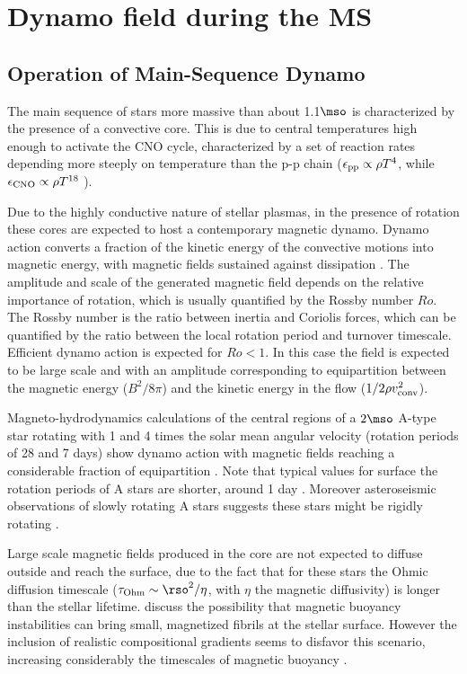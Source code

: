 \section{Dynamo field during the MS}
\subsection{Operation of Main-Sequence Dynamo}
The main sequence of stars more massive than about 1.1$\mso$ is characterized by the presence of a convective core.
This is due to central temperatures high enough to activate the CNO cycle, characterized by a set of reaction rates depending more steeply on temperature than the p-p chain ($\epsilon_{\rm pp}\propto \rho T^{4}$, while $\epsilon_{\rm CNO}\propto \rho T^{18}$ ).

Due to the highly conductive nature of stellar plasmas, in the presence of rotation
these cores are expected to host a contemporary magnetic dynamo. Dynamo action converts a fraction of the kinetic energy 
of the convective motions into magnetic energy, with magnetic fields sustained against dissipation  \citep[see e.g.,][]{Brandenburg_2005}. The amplitude and scale of the generated magnetic field depends on the relative importance of rotation, which is usually quantified by the Rossby number $Ro$. The Rossby number is the ratio between inertia and Coriolis forces, which can be quantified by the ratio between the local rotation period and turnover timescale. 
Efficient dynamo action is expected for $Ro<1$. In this case the field is expected to be large scale and with an amplitude corresponding to equipartition between the magnetic energy ($B^2/8\pi$) and the kinetic energy in the flow ($1/2\rho v^2_{\rm conv}$). 

Magneto-hydrodynamics calculations of the central regions of a $2\mso$ A-type star rotating with 
1 and 4 times the solar mean angular velocity (rotation periods of 28 and 7 days) show dynamo action 
with magnetic fields reaching a considerable fraction of equipartition \citep{Brun_2005}. Note that typical values for surface the rotation periods of A stars are shorter, around 1 day \cite{Zorec_2012}. Moreover asteroseismic observations of slowly rotating A stars suggests these stars might be rigidly rotating \cite{Kurtz_2014}.

Large scale magnetic fields produced in the core are not expected to diffuse outside and reach the surface, due to the fact that for these stars the Ohmic diffusion timescale ($\tau_{\rm Ohm}\sim \rso^2/\eta$, with $\eta$ the magnetic diffusivity) is longer than the stellar lifetime. \citet{MacGregor_2003} discuss the possibility that magnetic buoyancy instabilities can bring small, magnetized fibrils at the stellar surface. However the inclusion of realistic compositional gradients seems to disfavor this scenario, increasing considerably the timescales of magnetic buoyancy \citep{MacDonald_2004}.  




